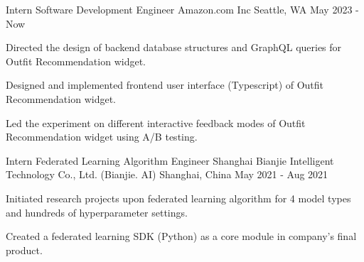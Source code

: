 

\begin{cventries}

  \cventry
    {Intern Software Development Engineer} %
    {Amazon.com Inc} %
    {Seattle, WA} %
    {May 2023 - Now} %
    {
      \begin{cvitems} %
        \item {Directed the design of backend database structures and GraphQL queries for Outfit Recommendation widget.}
        \item {Designed and implemented frontend user interface (Typescript) of Outfit Recommendation widget.}
        \item {Led the experiment on different interactive feedback modes of Outfit Recommendation widget using A/B testing.}
      \end{cvitems}
    }
  
  \cventry
    {Intern Federated Learning Algorithm Engineer} %
    {Shanghai Bianjie Intelligent Technology Co., Ltd. (Bianjie. AI)} %
    {Shanghai, China} %
    {May 2021 - Aug 2021} %
    {
      \begin{cvitems} %
        \item {Initiated research projects upon federated learning algorithm for 4 model types and hundreds of hyperparameter settings.}
        \item {Created a federated learning SDK (Python) as a core module in company's final product.}
      \end{cvitems}
    }

\end{cventries}

